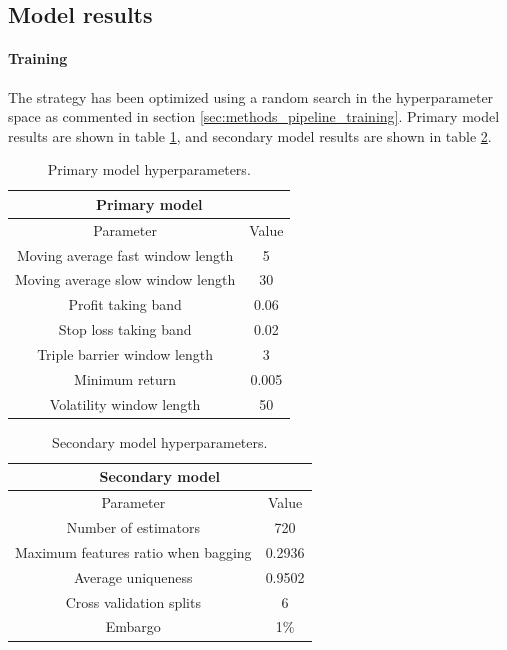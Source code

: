 \subsection{Model results}
\label{sec:model_results}

\paragraph{Training} The strategy has been optimized using a random search in
the hyperparameter space as commented in section \ref{sec:methods_pipeline_training}.
Primary model results are shown in table \ref{table:primary_model_hyperparameters},
and secondary model results are shown in table \ref{table:secondary_model_hyperparameters}.

\begin{table}[H]
  \centering
  \begin{tabular}{|c | c |} 
    \hline
    \multicolumn{2}{|c|}{Primary model} \\
    \hline
    Parameter & Value \\
    \hline
    Moving average fast window length & 5 \\
    \hline
    Moving average slow window length & 30 \\
    \hline
    Profit taking band                & 0.06 \\
    \hline
    Stop loss taking band             & 0.02 \\
    \hline
    Triple barrier window length      & 3 \\
    \hline
    Minimum return                    & 0.005 \\
    \hline
    Volatility window length          & 50 \\
    \hline 
  \end{tabular}
  \caption{Primary model hyperparameters.}
  \label{table:primary_model_hyperparameters}
\end{table}

\begin{table}[H]
  \centering
  \begin{tabular}{|c | c |} 
    \hline
    \multicolumn{2}{|c|}{Secondary model} \\
    \hline
    Parameter & Value \\
    \hline
    Number of estimators                & 720 \\
    \hline
    Maximum features ratio when bagging & 0.2936 \\
    \hline
    Average uniqueness                  & 0.9502 \\
    \hline
    Cross validation splits             & 6 \\
    \hline
    Embargo                             & 1\% \\
    \hline
  \end{tabular}
  \caption{Secondary model hyperparameters.}
  \label{table:secondary_model_hyperparameters}
\end{table}

